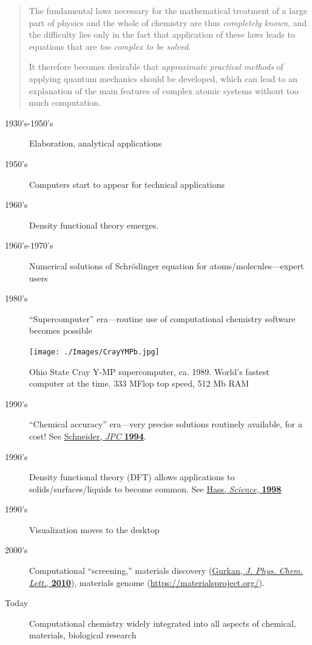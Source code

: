 \documentclass[11pt]{article}
\begin{document}
\begin{quote}
The fundamental laws necessary for the mathematical treatment of a
large part of physics and the whole of chemistry are thus \emph{completely
known}, and the difficulty lies only in the fact that application of
these laws leads to equations that are \emph{too complex to be solved}.

It therefore becomes desirable that \emph{approximate practical methods} of
applying quantum mechanics should be developed, which can lead to an
explanation of the main features of complex atomic systems without
too much computation.
\end{quote}

\begin{description}
\item[{1930's-1950's}] Elaboration, analytical applications

\item[{1950's}] Computers start to appear for technical applications

\item[{1960's}] Density functional theory emerges.

\item[{1960's-1970's}] Numerical solutions of Schr\"{o}dinger equation for atoms/molecules---expert users

\item[{1980's}] ``Supercomputer'' era---routine use of computational chemistry software becomes possible
\end{description}
\begin{figure}[htbp]
\centering
\texttt{[image: ./Images/CrayYMPb.jpg]}
\caption{Ohio State Cray Y-MP supercomputer, ca. 1989.  World's fastest computer at the time.  333 MFlop top speed, 512 Mb RAM}
\end{figure}

\begin{description}
\item[{1990's}] ``Chemical accuracy'' era---very precise solutions routinely available, for a cost!  See \href{./Resources/1994\_WFS\_JPC.pdf}{Schneider, \emph{JPC} \textbf{1994}}.

\item[{1990's}] Density functional theory (DFT) allows applications to solids/surfaces/liquids to become common. See \href{./Resources/1998\_Hass\_Science.pdf}{Hass, \emph{Science}, \textbf{1998}}

\item[{1990's}] Visualization moves to the desktop

\item[{2000's}] Computational ``screening,'' materials discovery (\href{http://www.crc.nd.edu/\~wschnei1/courses/CBE\_547/Resources/2010\_Gurkan\_JPCL.pdf}{Gurkan, \emph{J. Phys. Chem. Lett.}, \textbf{2010}}), materials genome (\url{https://materialsproject.org/}).

\item[{Today}] Computational chemistry widely integrated into all aspects of chemical, materials, biological research
\end{description}
\end{document}
